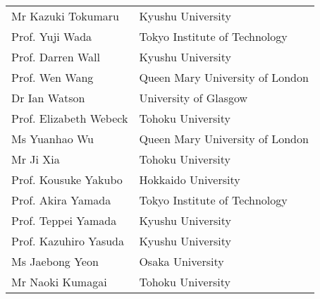 \begin{longtable}{ll}
Mr  Kazuki Tokumaru & Kyushu University \\
Prof. Yuji Wada & Tokyo Institute of Technology \\
Prof. Darren Wall & Kyushu University \\
Prof. Wen Wang & Queen Mary University of London \\
Dr Ian Watson & University of Glasgow \\
Prof. Elizabeth Webeck & Tohoku University \\
Ms  Yuanhao Wu & Queen Mary University of London \\
Mr  Ji Xia & Tohoku University \\
Prof. Kousuke Yakubo & Hokkaido University \\
Prof. Akira Yamada & Tokyo Institute of Technology \\
Prof. Teppei Yamada & Kyushu University \\
Prof. Kazuhiro Yasuda & Kyushu University \\
Ms  Jaebong Yeon & Osaka University \\
Mr  Naoki Kumagai & Tohoku University \\

\end{longtable}
